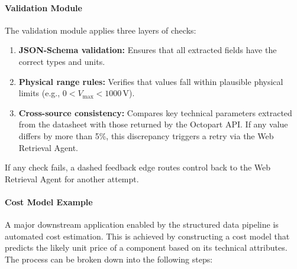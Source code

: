 \paragraph{Validation Module}  
The validation module applies three layers of checks:
\begin{enumerate}
  \item \textbf{JSON-Schema validation:} Ensures that all extracted fields have the correct types and units.
  \item \textbf{Physical range rules:} Verifies that values fall within plausible physical limits (e.g., $0 < V_{\max} < 1000\,\mathrm{V}$).
  \item \textbf{Cross-source consistency:} Compares key technical parameters extracted from the datasheet with those returned by the Octopart API. If any value differs by more than 5\%, this discrepancy triggers a retry via the Web Retrieval Agent.
\end{enumerate}
If any check fails, a dashed feedback edge routes control back to the Web Retrieval Agent for another attempt.

\paragraph{Cost Model Example}  
A major downstream application enabled by the structured data pipeline is automated cost estimation. This is achieved by constructing a cost model that predicts the likely unit price of a component based on its technical attributes. The process can be broken down into the following steps:

